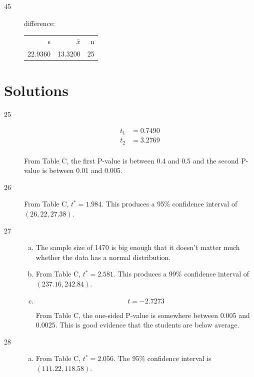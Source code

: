\documentclass[letterpaper]{exam}
\begin{document}
\begin{description}
    \item[45] difference:

      \begin{tabular}{rrr}
        \toprule
        s      & $\bar{x}$ & n \\
        22.9360 & 13.3200 & 25 \\ 
        \bottomrule
      \end{tabular}


  \end{description}
  \fi
  \ifprintanswers{}
    \section{Solutions}
    \begin{description}

      \item[25] 
        \begin{align*}
          t_1 &= 0.7490 \\
          t_2 &= 3.2769 \\
        \end{align*}

        From Table C, the first P-value is between 0.4 and 0.5 and the second
        P-value is between 0.01 and 0.005.

      \item[26]
        From Table C, $t^* = 1.984$. This produces a 95\% confidence interval of
        $(26,22, 27.38)$.

      \item[27]
        \begin{enumerate}[(a)]
          \item The sample size of 1470 is big enough that it doesn't matter
            much whether the data has a normal distribution.

          \item From Table C, $t^* = 2.581$. This produces a 99\% confidence
            interval of $(237.16, 242.84)$.

          \item 
            \[
              t = -2.7273
            \]

            From Table C, the one-sided P-value is somewhere between 0.005 and
            0.0025. This is good evidence that the students are below average.

        \end{enumerate}

      \item[28]
        \begin{enumerate}[(a)]
          \item From Table C, $t^* = 2.056$.  The 95\% confidence interval is
            $(111.22, 118.58)$.


\end{enumerate}
\end{description}
\end{document}
